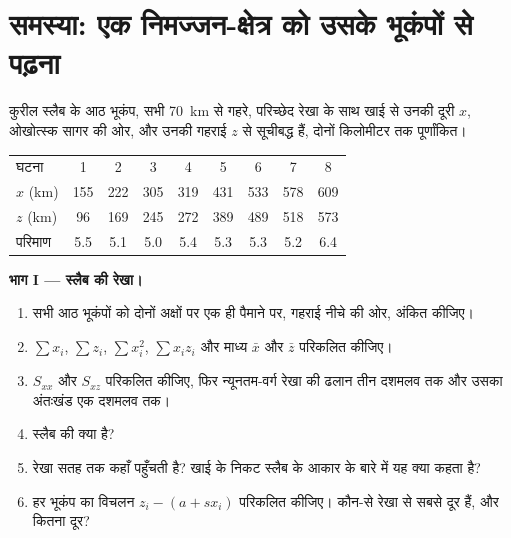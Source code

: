 \section{समस्या: एक निमज्जन-क्षेत्र को उसके भूकंपों से पढ़ना}

\begin{problem}
\label{pb:b1:active-margins:1}
कुरील स्लैब के आठ भूकंप, सभी \qty{70}{km} से गहरे, परिच्छेद रेखा के साथ खाई से उनकी दूरी $x$, ओखोत्स्क सागर की ओर, और उनकी गहराई $z$ से सूचीबद्ध हैं, दोनों किलोमीटर तक पूर्णांकित।

\begin{center}
\small
\begin{tabular}{lcccccccc}
\hline
घटना & 1 & 2 & 3 & 4 & 5 & 6 & 7 & 8\\
$x$ (\unit{km}) & 155 & 222 & 305 & 319 & 431 & 533 & 578 & 609\\
$z$ (\unit{km}) & 96 & 169 & 245 & 272 & 389 & 489 & 518 & 573\\
परिमाण & 5.5 & 5.1 & 5.0 & 5.4 & 5.3 & 5.3 & 5.2 & 6.4\\
\hline
\end{tabular}
\end{center}

\medskip
\noindent\textbf{भाग I --- स्लैब की रेखा।}
\begin{enumerate}
  \item सभी आठ भूकंपों को दोनों अक्षों पर एक ही पैमाने पर, गहराई नीचे की ओर, अंकित कीजिए।
  \item $\sum x_i$, $\sum z_i$, $\sum x_i^2$, $\sum x_i z_i$ और माध्य $\bar x$ और $\bar z$ परिकलित कीजिए।
  \item $S_{xx}$ और $S_{xz}$ परिकलित कीजिए, फिर न्यूनतम-वर्ग रेखा की ढलान तीन दशमलव तक और उसका अंतःखंड एक दशमलव तक।
  \item स्लैब की  क्या है?
  \item रेखा सतह तक कहाँ पहुँचती है? खाई के निकट स्लैब के आकार के बारे में यह क्या कहता है?
  \item हर भूकंप का विचलन $z_i - (a + s x_i)$ परिकलित कीजिए। कौन-से रेखा से सबसे दूर हैं, और कितना दूर?
\end{enumerate}


\end{problem}

